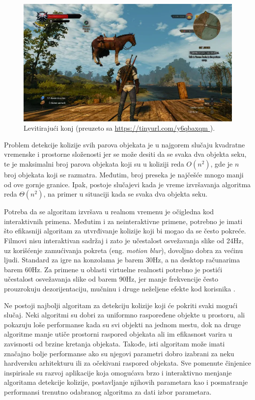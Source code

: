 \documentclass[12pt,oneside]{memoir}
\begin{document}
\begin{figure}
	\centering
	\includegraphics[scale=0.54]{horse.png}
	\caption{Levitirajući konj (preuzeto sa \url{ https://tinyurl.com/y6qbaxqm }).}
	
	\label{fig:horse}
\end{figure}

Problem detekcije kolizije svih parova objekata je u najgorem slučaju kvadratne vremenske i prostorne složenosti 
jer se može desiti da se svaka dva objekta seku, te je maksimalni broj parova objekata koji su u koliziji reda $O(n^2)$, 
gde je $n$ broj objekata koji se razmatra.
Međutim, broj preseka je najčešće mnogo manji od ove gornje granice.
Ipak, postoje slučajevi kada je vreme izvršavanja algoritma reda $\Theta(n^2)$, na primer u situaciji kada se svaka dva objekta seku.

Potreba da se algoritam izvršava u realnom vremenu je očigledna kod interaktivnih primena.
Međutim i za neinteraktivne primene, potrebno je imati što efikasniji algoritam za utvrđivanje kolizije koji bi mogao da se često pokreće.
Filmovi nisu interaktivan sadržaj i zato je učestalost osvežavanja slike od 24Hz, uz korišćenje zamućivanja pokreta (eng. {\em motion blur}),
dovoljno dobra za većinu ljudi. Standard za igre na konzolama je barem 30Hz, a na desktop računarima  barem 60Hz. 
Za primene u oblasti virtuelne realnosti potrebno je postići učestalost osvežavanja slike od barem 90Hz, jer manje frekvencije često prouzrokuju
dezorijentaciju, mučninu i druge neželjene efekte kod korisnika \cite{importance}.

Ne postoji najbolji algoritam za detekciju kolizije koji će pokriti svaki mogući slučaj. 
Neki algoritmi su dobri za uniformno raspoređene objekte u prostoru, ali pokazuju loše performanse kada su svi objekti na jednom mestu, 
dok na druge algoritme manje utiče prostorni raspored objekata ali im efikasnost varira u zavisnosti od brzine kretanja objekata.
Takođe, isti algoritam može imati značajno bolje performanse ako su njegovi parametri dobro 
izabrani za neku hardversku arhitekturu ili za očekivani raspored objekata. 
Sve pomenute činjenice inspirisale su razvoj aplikacije koja omogućava brzo i interaktivno menjanje
algoritama detekcije kolizije, postavljanje njihovih parametara kao 
i  posmatranje performansi trenutno odabranog algoritma za dati izbor parametara.
\end{document}
